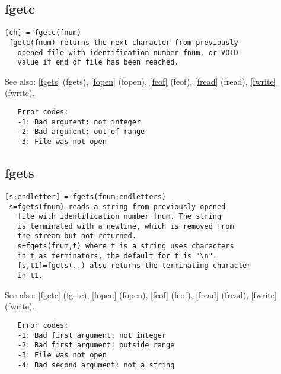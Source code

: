 \documentclass[a4paper]{article}
\begin{document}
\subsection{fgetc\label{fgetc}}

\begin{tscreen}
\begin{verbatim}
[ch] = fgetc(fnum)
 fgetc(fnum) returns the next character from previously
   opened file with identification number fnum, or VOID
   value if end of file has been reached.
\end{verbatim}

See also: \ref{fgets} {(fgets)}, \ref{fopen} {(fopen)}, \ref{feof} {(feof)}, \ref{fread} {(fread)}, \ref{fwrite} {(fwrite)}.
\begin{verbatim}
   Error codes:
   -1: Bad argument: not integer
   -2: Bad argument: out of range
   -3: File was not open
\end{verbatim}
\end{tscreen}





\subsection{fgets\label{fgets}}

\begin{tscreen}
\begin{verbatim}
[s;endletter] = fgets(fnum;endletters)
 s=fgets(fnum) reads a string from previously opened
   file with identification number fnum. The string
   is terminated with a newline, which is removed from
   the stream but not returned.
   s=fgets(fnum,t) where t is a string uses characters
   in t as terminators, the default for t is "\n".
   [s,t1]=fgets(..) also returns the terminating character
   in t1.
\end{verbatim}

See also: \ref{fgetc} {(fgetc)}, \ref{fopen} {(fopen)}, \ref{feof} {(feof)}, \ref{fread} {(fread)}, \ref{fwrite} {(fwrite)}.
\begin{verbatim}
   Error codes:
   -1: Bad first argument: not integer
   -2: Bad first argument: outside range
   -3: File was not open
   -4: Bad second argument: not a string
   
\end{verbatim}
\end{tscreen}
\end{document}
